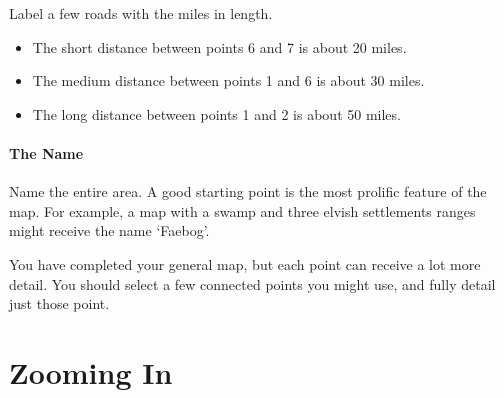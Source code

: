 \begin{multicols}{2}
Label a few roads with the miles in length.

\begin{itemize}
  \item
  The short distance between points 6 and 7 is about 20 miles.
  \item
  The medium distance between points 1 and 6 is about 30 miles.
  \item
  The long distance between points 1 and 2 is about 50 miles.
\end{itemize}

\paragraph{The Name}

Name the entire area.
A good starting point is the most prolific feature of the map.
For example, a map with a swamp and three elvish settlements ranges might receive the name `Faebog'.

You have completed your general map, but each point can receive a lot more detail.
You should select a few connected points you might use, and fully detail just those point.

\end{multicols}

\section{Zooming In}
\label{mapCharacter}

